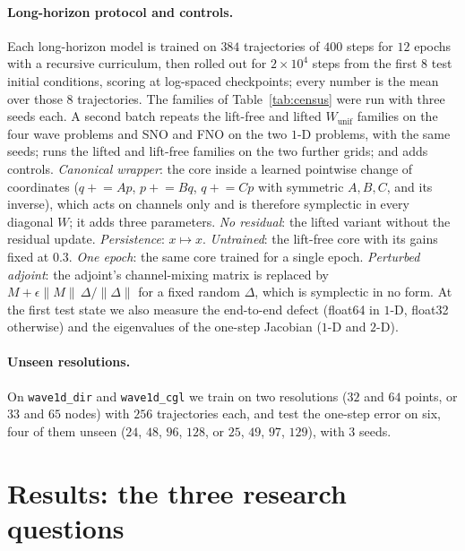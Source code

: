 \documentclass[11pt]{article}
\theoremstyle{definition}
\theoremstyle{remark}
\newcommand{\Wu}{W_{\mathrm{unif}}}
\begin{document}
\paragraph{Long-horizon protocol and controls.} Each long-horizon model is
trained on $384$ trajectories of $400$ steps for $12$ epochs with a recursive
curriculum, then rolled out for $2\times10^{4}$ steps from the first $8$ test
initial conditions, scoring at log-spaced checkpoints; every number is the mean
over those $8$ trajectories. The families of Table~\ref{tab:census} were run with
three seeds each. A second batch repeats the lift-free and lifted $\Wu$ families
on the four wave problems and SNO and FNO on the two $1$-D problems, with the
same seeds; runs the lifted and lift-free families on the two further grids; and
adds controls. \emph{Canonical wrapper}: the core
inside a learned pointwise change of coordinates
($q\mathrel{+}=Ap$, $p\mathrel{+}=Bq$, $q\mathrel{+}=Cp$ with symmetric $A,B,C$,
and its inverse), which acts on channels only and is therefore symplectic in
every diagonal $W$; it adds three parameters. \emph{No residual}: the lifted
variant without the residual update. \emph{Persistence}: $x\mapsto x$.
\emph{Untrained}: the lift-free core with its gains fixed at $0.3$.
\emph{One epoch}: the same core trained for a single epoch.
\emph{Perturbed adjoint}: the adjoint's channel-mixing matrix is replaced by
$M+\epsilon\lVert M\rVert\,\Delta/\lVert\Delta\rVert$ for a fixed random $\Delta$,
which is symplectic in no form. At the first test state we also measure the
end-to-end defect (float64 in $1$-D, float32 otherwise) and the eigenvalues of the
one-step Jacobian ($1$-D and $2$-D).

\paragraph{Unseen resolutions.} On \texttt{wave1d\_dir} and \texttt{wave1d\_cgl}
we train on two resolutions ($32$ and $64$ points, or $33$ and $65$ nodes) with
$256$ trajectories each, and test the one-step error on six, four of them unseen
($24$, $48$, $96$, $128$, or $25$, $49$, $97$, $129$), with $3$ seeds.

\section{Results: the three research questions}
\label{sec:results}
\end{document}
